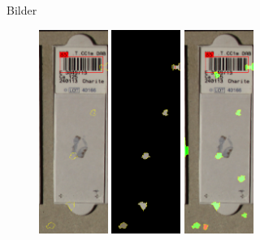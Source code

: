 \documentclass{beamer}
\begin{document}
  \begin{frame}{Bilder}
    \begin{figure}
      \includegraphics[width=0.2\textwidth]{./assets/Cell111308_1_9_top1_positiveonlywithrest.PNG}
      \hfill
      \includegraphics[width=0.2\textwidth]{./assets/Cell111308_1_9_top1_positiveonly.PNG}
      \hfill
      \includegraphics[width=0.2\textwidth]{./assets/Cell111308_1_9_top1_proscons.PNG}

\end{figure}
\end{frame}
\end{document}

